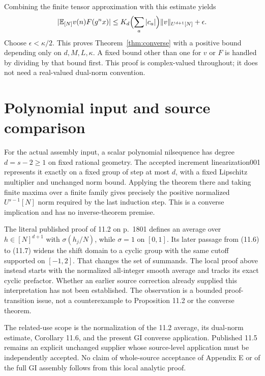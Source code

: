 \documentclass[11pt]{article}
\begin{document}
Combining the finite tensor approximation with this estimate yields
\[
 |\mathbb E_{[N]}v(n)F(g^nx)|
 \leq K_d\Bigl(\sum_a|c_a|\Bigr)
                     \|v\|_{U^{d+1}[N]}+\epsilon.
\]
Choose $\epsilon<\kappa/2$. This proves
Theorem~\ref{thm:converse} with a positive bound depending only on
$d,M,L,\kappa$. A fixed bound other than one for $v$ or $F$ is
handled by dividing by that bound first. This proof is complex-valued
throughout; it does not need a real-valued dual-norm convention.

\section{Polynomial input and source comparison}

For the actual assembly input, a scalar polynomial nilsequence has
degree $d=s-2\geq1$ on fixed rational geometry. The accepted
increment linearization001 represents it exactly on a fixed group
of step at most $d$, with a fixed Lipschitz multiplier and unchanged
norm bound. Applying the theorem there and taking finite maxima
over a finite family gives precisely the positive normalized
$U^{s-1}[N]$ norm required by the last induction step. This is a
converse implication and has no inverse-theorem premise.

The literal published proof of 11.2 on p.~1801 defines an average
over $h\in[N]^{d+1}$ with $\sigma(h_j/N)$, while $\sigma=1$ on
$[0,1]$. Its later passage from (11.6) to (11.7) widens the shift
domain to a cyclic group with the same cutoff supported on $[-1,2]$.
That changes the set of summands. The local proof above instead
starts with the normalized all-integer smooth average and tracks
its exact cyclic prefactor. Whether an earlier source correction
already supplied this interpretation has not been established.
The observation is a bounded proof-transition issue, not a
counterexample to Proposition 11.2 or the converse theorem.

The related-use scope is the normalization of the 11.2 average,
its dual-norm estimate, Corollary 11.6, and the present GI converse
application. Published 11.5 remains an explicit unchanged supplier
whose source-level application must be independently accepted.
No claim of whole-source acceptance of Appendix E or of the full
GI assembly follows from this local analytic proof.
\end{document}
